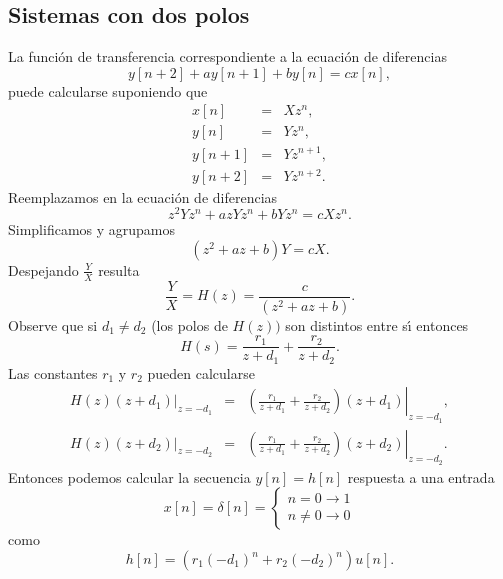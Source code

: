 \subsection{Sistemas con dos polos}

La funci\'{o}n de transferencia correspondiente a la ecuaci\'{o}n de
diferencias 
\begin{equation}
        y\left[ n+2\right] +ay\left[ n+1\right] +by\left[ n\right] =cx\left[ n\right],
\end{equation}
puede calcularse suponiendo que 
\begin{eqnarray}
        x\left[ n\right] &=&Xz^n, \\
        y\left[ n\right] &=&Yz^n, \\
        y\left[ n+1\right] &=&Yz^{n+1}, \\
        y\left[ n+2\right] &=&Yz^{n+2}.
\end{eqnarray}
Reemplazamos en la ecuaci\'{o}n de diferencias 
\begin{equation}
        z^{2}Yz^n+azYz^n+bYz^n=cXz^n.
\end{equation}
Simplificamos y agrupamos 
\begin{equation}
        \left( z^{2}+az+b\right) Y=cX.
\end{equation}
Despejando $\frac{Y}{X}$ resulta 
\begin{equation}
        \frac{Y}{X}=H\left( z\right) =\frac{c}{\left( z^{2}+az+b\right) }.
\end{equation}
Observe que si $d_{1}\neq d_{2}$ (los polos de $H\left( z\right) )$ son distintos entre s\'{\i} entonces 
\begin{equation}
        H\left( s\right) =\frac{r_{1}}{z+d_{1}}+\frac{r_{2}}{z+d_{2}}.
\end{equation}
Las constantes $r_{1}$ y $r_{2}$ pueden calcularse 
\begin{eqnarray}
\left. H\left( z\right) \left( z+d_{1}\right) \right| _{z=-d_{1}} &=&
\left.\left( \frac{r_{1}}{z+d_{1}}+\frac{r_{2}}{z+d_{2}}\right) \left(z+d_{1}\right) \right| _{z=-d_{1}},\\
\left. H\left( z\right) \left( z+d_{2}\right) \right| _{z=-d_{2}} &=&
\left.\left( \frac{r_{1}}{z+d_{1}}+\frac{r_{2}}{z+d_{2}}\right) \left(z+d_{2}\right) \right| _{z=-d_{2}}.
\end{eqnarray}
Entonces podemos calcular la secuencia $y\left[ n\right] =h\left[ n\right] $ respuesta a una entrada
\begin{equation} 
        x\left[ n\right] =\delta \left[ n\right] =
                \left\{ \begin{array}{c}
                        n=0\rightarrow 1 \\ 
                        n\neq 0\rightarrow 0
                \end{array} \right.
\end{equation} como 
\begin{equation}
h\left[ n\right] =\left( r_{1}\left( -d_{1}\right) ^n+r_{2}\left(-d_{2}\right) ^n\right) u\left[ n\right].
\end{equation}

